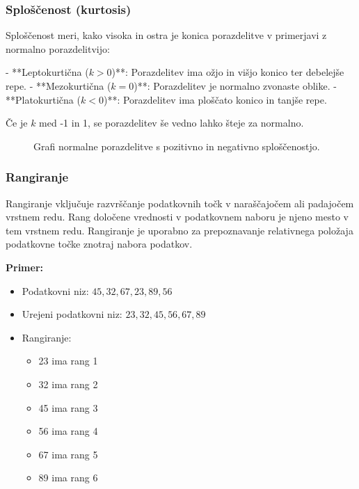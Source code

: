 \subsubsection*{Sploščenost (kurtosis)}

Sploščenost meri, kako visoka in ostra je konica porazdelitve v primerjavi z normalno porazdelitvijo:

- **Leptokurtična ($k > 0$)**: Porazdelitev ima ožjo in višjo konico ter debelejše repe.
- **Mezokurtična ($k = 0$)**: Porazdelitev je normalno zvonaste oblike.
- **Platokurtična ($k < 0$)**: Porazdelitev ima ploščato konico in tanjše repe.

Če je $k$ med -1 in 1, se porazdelitev še vedno lahko šteje za normalno.

\begin{figure}
\centering
{}
\caption{Grafi normalne porazdelitve s pozitivno in negativno sploščenostjo.}
\end{figure}

\subsubsection*{Rangiranje}

Rangiranje vključuje razvrščanje podatkovnih točk v naraščajočem ali padajočem vrstnem redu. Rang določene vrednosti v podatkovnem naboru je njeno mesto v tem vrstnem redu. Rangiranje je uporabno za prepoznavanje relativnega položaja podatkovne točke znotraj nabora podatkov.

\textbf{Primer:}
\begin{itemize}
    \item Podatkovni niz: $45, 32, 67, 23, 89, 56$
    \item Urejeni podatkovni niz: $23, 32, 45, 56, 67, 89$
    \item Rangiranje: 
    \begin{itemize}
        \item 23 ima rang 1
        \item 32 ima rang 2
        \item 45 ima rang 3
        \item 56 ima rang 4
        \item 67 ima rang 5
        \item 89 ima rang 6
    \end{itemize}
\end{itemize}

